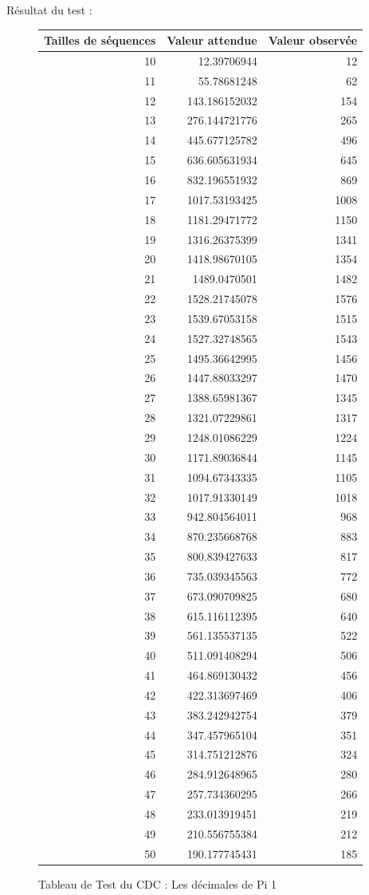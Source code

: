 \documentclass[10pt,a4paper]{article}
\begin{document}
\newpage
Résultat du test :
\begin{figure}[h]
\centering
\begin{tabular}{|r|r|r|}
\hline
Tailles de séquences & Valeur attendue & Valeur observée\\
\hline
10 & 12.39706944 & 12\\
11 & 55.78681248 & 62\\
12 & 143.186152032 & 154\\
13 & 276.144721776 & 265\\
14 & 445.677125782 & 496\\
15 & 636.605631934 & 645\\
16 & 832.196551932 & 869\\
17 & 1017.53193425 & 1008\\
18 & 1181.29471772 & 1150\\
19 & 1316.26375399 & 1341\\
20 & 1418.98670105 & 1354\\
21 & 1489.0470501 & 1482\\
22 & 1528.21745078 & 1576\\
23 & 1539.67053158 & 1515\\
24 & 1527.32748565 & 1543\\
25 & 1495.36642995 & 1456\\
26 & 1447.88033297 & 1470\\
27 & 1388.65981367 & 1345\\
28 & 1321.07229861 & 1317\\
29 & 1248.01086229 & 1224\\
30 & 1171.89036844 & 1145\\
31 & 1094.67343335 & 1105\\
32 & 1017.91330149 & 1018\\
33 & 942.804564011 & 968\\
34 & 870.235668768 & 883\\
35 & 800.839427633 & 817\\
36 & 735.039345563 & 772\\
37 & 673.090709825 & 680\\
38 & 615.116112395 & 640\\
39 & 561.135537135 & 522\\
40 & 511.091408294 & 506\\
41 & 464.869130432 & 456\\
42 & 422.313697469 & 406\\
43 & 383.242942754 & 379\\
44 & 347.457965104 & 351\\
45 & 314.751212876 & 324\\
46 & 284.912648965 & 280\\
47 & 257.734360295 & 266\\
48 & 233.013919451 & 219\\
49 & 210.556755384 & 212\\
50 & 190.177745431 & 185\\
\hline
\end{tabular}
\caption{Tableau de Test du CDC : Les décimales de Pi 1}
\end{figure}
\end{document}
